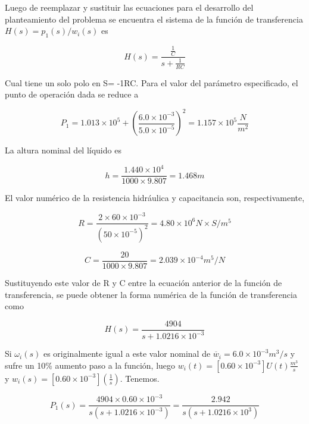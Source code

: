 \documentclass[a4paper,12pt,twoside]{proyectotanquesecci}
\begin{document}
Luego de reemplazar y sustituir las ecuaciones para el desarrollo del planteamiento del problema se encuentra el sistema de la función de transferencia $H\left( s\right) =p_{1}\left( s\right) /w_{i}\left( s\right)$ es

\begin{equation}
H\left( s\right) =\frac {\frac {1}{C}}{s+\frac {1}{RC}}
\end{equation}

Cual tiene un solo polo en S= -1RC. Para el valor del parámetro especificado, el punto de operación dada se reduce a

\begin{equation}
P_{1}=1.013\times 10^{5}+\left( \frac {6.0\times 10^{-3}}{5.0\times 10^{-5}}\right) ^{2}=1.157\times 10^{5}\frac {N}{m^{2}}
\end{equation}

La altura nominal del líquido es

\begin{equation}
h=\frac {1.440\times 10^{4}}{1000\times 9.807}=1.468m
\end{equation}

El valor numérico de la resistencia hidráulica y capacitancia son, respectivamente,

\begin{equation}
R=\frac {2\times 60\times 10^{-3}}{\left( 50\times 10^{-5}\right) ^{2}}=4.80\times 10^{6}N\times S/m^{5}
\end{equation}

\begin{equation}
C=\frac {20}{1000\times 9.807}=2.039\times 10^{-4}m^{5}/N
\end{equation}

Sustituyendo este valor de R y C entre la ecuación anterior de la función de transferencia, se puede obtener la forma numérica  de la función de transferencia como

\begin{equation}
H\left( s\right) =\frac {4904}{s+1.0216\times 10^{-3}}
\end{equation}

Si $\omega_{i}(s)$ es originalmente igual a este valor nominal de $\overline {w}_{i}=6.0\times 10^{-3}m^{3}/s$ y sufre un 10\% aumento paso a la función, luego $w_{i}\left( t\right) =\left[ 0.60\times 10^{-3}\right] U\left( t\right) \frac {m^{3}}{s}$ y $w_{i}\left( s\right) =\left[ 0.60\times 10^{-3}\right] \left( \frac {1}{s}\right)$. Tenemos.

\begin{equation}
P_{1}\left( s\right) =\frac {4904\times 0.60\times 10^{-3}}{s\left( s+1.0216\times 10^{-3}\right) }
=\frac {2.942}{s\left( s+1.0216\times 10^{3}\right) }
\end{equation}
\end{document}
